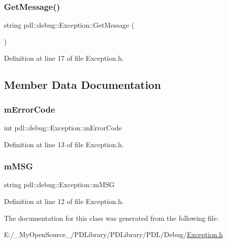 \subsubsection{\texorpdfstring{GetMessage()}{GetMessage()}}
{\footnotesize\ttfamily string pdl\+::debug\+::\+Exception\+::\+Get\+Message (\begin{DoxyParamCaption}{ }\end{DoxyParamCaption})\hspace{0.3cm}{\ttfamily [inline]}}



Definition at line 17 of file Exception.\+h.


\begin{DoxyCode}{0}

\end{DoxyCode}


\subsection{Member Data Documentation}
\mbox{\label{classpdl_1_1debug_1_1_exception_a747e05300740d6f7dc0ddd729a3e07d7}} 
\subsubsection{\texorpdfstring{mErrorCode}{mErrorCode}}
{\footnotesize\ttfamily int pdl\+::debug\+::\+Exception\+::m\+Error\+Code\hspace{0.3cm}{\ttfamily [protected]}}



Definition at line 13 of file Exception.\+h.

\mbox{\label{classpdl_1_1debug_1_1_exception_a66c86b5f3835f41fc953c1bae576d39c}} 
\subsubsection{\texorpdfstring{mMSG}{mMSG}}
{\footnotesize\ttfamily string pdl\+::debug\+::\+Exception\+::m\+M\+SG\hspace{0.3cm}{\ttfamily [protected]}}



Definition at line 12 of file Exception.\+h.



The documentation for this class was generated from the following file\+:\begin{DoxyCompactItemize}
\item 
E\+:/\+\_\+\+My\+Open\+Source\+\_\+/\+P\+D\+Library/\+P\+D\+Library/\+P\+D\+L/\+Debug/\mbox{\hyperlink{_exception_8h}{Exception.\+h}}\end{DoxyCompactItemize}
